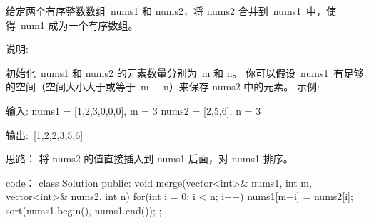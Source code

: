 给定两个有序整数数组 nums1 和 nums2，将 nums2 合并到 nums1 中，使得 num1 成为一个有序数组。

说明:

初始化 nums1 和 nums2 的元素数量分别为 m 和 n。
你可以假设 nums1 有足够的空间（空间大小大于或等于 m + n）来保存 nums2 中的元素。
示例:

输入:
nums1 = [1,2,3,0,0,0], m = 3
nums2 = [2,5,6],       n = 3

输出: [1,2,2,3,5,6]



























思路：
将 nums2 的值直接插入到 nums1 后面，对 nums1 排序。



























code：
class Solution {
public:
    void merge(vector<int>& nums1, int m, vector<int>& nums2, int n) {
        for(int i = 0; i < n; i++)
        {
            nums1[m+i] = nums2[i];
        }
        sort(nums1.begin(), nums1.end());
    }
};